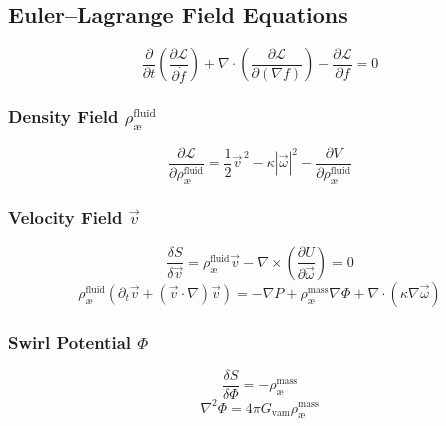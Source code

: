 \documentclass[12pt]{article}
\begin{document}
\subsection{Euler--Lagrange Field Equations}
\begin{equation}
    \frac{\partial}{\partial t} \left( \frac{\partial \mathcal{L}}{\partial \dot{f}} \right) + \nabla \cdot \left( \frac{\partial \mathcal{L}}{\partial (\nabla f)} \right) - \frac{\partial \mathcal{L}}{\partial f} = 0
\end{equation}

\subsubsection*{Density Field \( \rho_\text{\ae}^{\text{fluid}} \)}
\begin{equation}
    \frac{\partial \mathcal{L}}{\partial \rho_\text{\ae}^{\text{fluid}}} = \frac{1}{2} \vec{v}^{\,2} - \kappa |\vec{\omega}|^2 - \frac{\partial V}{\partial \rho_\text{\ae}^{\text{fluid}}}
\end{equation}

\subsubsection{Velocity Field \( \vec{v} \)}
\begin{equation}
    \frac{\delta S}{\delta \vec{v}} = \rho_\text{\ae}^{\text{fluid}} \vec{v} - \nabla \times \left( \frac{\partial U}{\partial \vec{\omega}} \right) = 0
\end{equation}
\begin{equation}
    \rho_\text{\ae}^{\text{fluid}} \left( \partial_t \vec{v} + (\vec{v} \cdot \nabla)\vec{v} \right) = -\nabla P + \rho_\text{\ae}^{\text{mass}} \nabla \Phi + \nabla \cdot \left( \kappa \nabla \vec{\omega} \right)
\end{equation}

\subsubsection{Swirl Potential \( \Phi \)}
\begin{equation}
    \frac{\delta S}{\delta \Phi} = -\rho_\text{\ae}^{\text{mass}}
\end{equation}
\begin{equation}
    \nabla^2 \Phi = 4\pi G_{\mathrm{vam}} \rho_\text{\ae}^{\text{mass}}
\end{equation}
\end{document}
